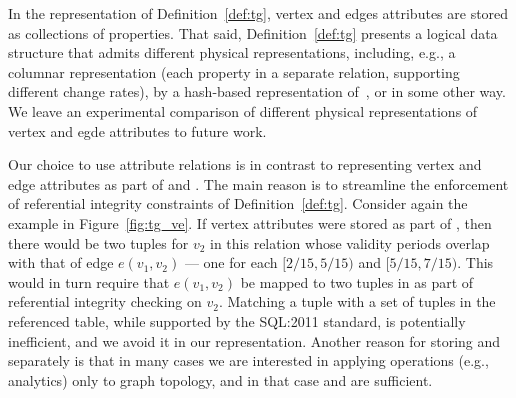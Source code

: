 

In the \tg representation of Definition~\ref{def:tg}, vertex and edges
attributes are stored as collections of properties.  That said,
Definition~\ref{def:tg} presents a logical data structure that admits
different physical representations, including, e.g., a columnar
representation (each property in a separate relation, supporting
different change rates), by a hash-based representation
of~\cite{DBLP:conf/sigmod/SunFSKHX15}, or in some other way. We leave
an experimental comparison of different physical representations of
vertex and egde attributes to future work.


Our choice to use attribute relations is in contrast to representing
vertex and edge attributes as part of \tv and \te.  The main reason is
to streamline the enforcement of referential integrity constraints of
Definition~\ref{def:tg}.  Consider again the example in
Figure~\ref{fig:tg_ve}.  If vertex attributes were stored as part of
\tv, then there would be two tuples for $v_2$ in this relation whose
validity periods overlap with that of edge $e(v_1, v_2)$ --- one for
each $[2/15, 5/15)$ and $[5/15, 7/15)$.  This would in turn require
    that $e(v_1, v_2)$ be mapped to two tuples in \tv as part of
    referential integrity checking on $v_2$.  Matching a tuple with a
    set of tuples in the referenced table, while supported by the
    SQL:2011 standard, is potentially inefficient, and we avoid it in
    our representation.
%
Another reason for storing \tav and \tae separately is that in many
cases we are interested in applying operations (e.g., analytics) only
to graph topology, and in that case \tv and \te are sufficient.
%

